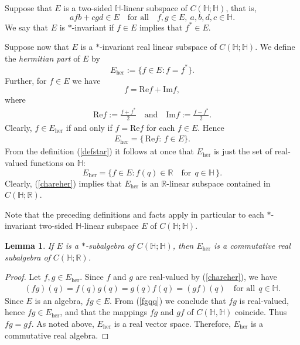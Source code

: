 \documentclass[11pt,a4paper]{amsart}
\newtheorem{lemma}[theorem]{Lemma}
\theoremstyle{definition}
\begin{document}
Suppose that $E$ is a two-sided $\mathbb{H}$-linear subspace of
$C(\mathbb{H};\mathbb{H})$, that is,
%
\begin{equation*}
afb+ cgd\in E\quad \text{for all} \quad f,g\in E , ~a,b,d,c\in
\mathbb{H}.
\end{equation*}
%
We say that $E$ is $*$-invariant if $f\in E$ implies that
$f^{*}\in E$.

Suppose now that $E$ is a $*$-invariant real linear subspace of
$C(\mathbb{H};\mathbb{H})$. We define the \emph{hermitian part} of
$E$ by
%
\begin{equation*}
E_{\mathrm{her}}:= \{ f\in E: f=f^{*}\}.
\end{equation*}
%
Further, for $f\in E$ we have
%
\begin{equation*}
f=\mathrm{Re}f+ \mathrm{Im}f,
\end{equation*}
%
where
%
\begin{align*}
\mathrm{Re}f:=\frac{f+f^{*}}{2}\quad \textrm{and} \quad \mathrm{Im}f:=
\frac{f-f^{*}}{2}.
\end{align*}
%
Clearly, $f\in E_{\mathrm{her}}$ if and only if $f=\mathrm{Re}f$ for each
$f\in E$. Hence
%
\begin{align}
\label{EherRe}
E_{\mathrm{her}}=\{\, \mathrm{Re}f: \, f\in E\}.
\end{align}
%
From the definition (\ref{defstar}) it follows at once that
$ E_{\mathrm{her}}$ is just the set of real-valued functions on
$\mathbb{H}$:
%
\begin{equation}
\label{chareher}
E_{\mathrm{her}}= \{ f\in E: f(q)\in \mathbb{R}\quad \text{for}~~ q
\in \mathbb{H}\, \}.
\end{equation}
%
Clearly, (\ref{chareher}) implies that $E_{\mathrm{her}}$ is an
$\mathbb{R}$-linear subspace contained in $C(\mathbb{H};\mathbb{R})$.

Note that the preceding definitions and facts apply in particular to each
$*$-invariant two-sided $\mathbb{H}$-linear subspace $E$ of
$C(\mathbb{H};\mathbb{H})$.
%
\begin{lemma}%
\label{commutative}
If $E$ is a $*$-subalgebra of $C(\mathbb{H};\mathbb{H})$, then
$E_{\mathrm{her}}$ is a commutative real subalgebra of
$C(\mathbb{H}; \mathbb{R})$.
\end{lemma}
%
\begin{proof}
Let $f,g \in E_{\mathrm{her}}$. Since $f$ and $g$ are real-valued by (\ref{chareher}),
we have
%
\begin{align}
\label{fgqq}
(fg)(q)=f(q)g(q)=g(q)f(q)=(gf)(q)\quad \text{for all}~~ q\in
\mathbb{H}.
\end{align}
%
Since $E$ is an algebra, $fg\in E$. From (\ref{fgqq}) we conclude that
$fg$ is real-valued, hence $fg\in E_{\mathrm{her}}$, and that the mappings
$fg$ and $gf$ of $C(\mathbb{H}, \mathbb{H})$ coincide. Thus $fg=gf$. As
noted above, $E_{\mathrm{her}}$ is a real vector space. Therefore,
$E_{\mathrm{her}}$ is a commutative real algebra.
\end{proof}
\end{document}
